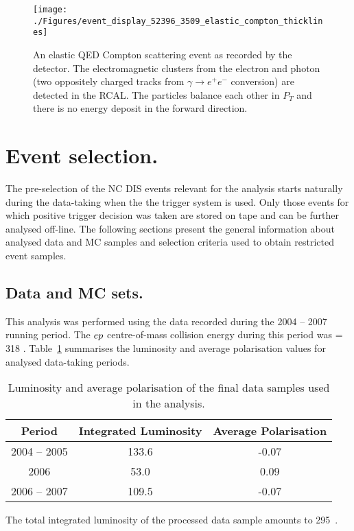 \begin{figure}[htbp]
	\centering
	\texttt{[image: ./Figures/event\_display\_52396\_3509\_elastic\_compton\_thicklines]} 
	\caption{An elastic QED Compton scattering event as recorded by the \zeus detector. The electromagnetic clusters from the electron and photon (two oppositely charged tracks from $\gamma \rightarrow e^+e^-$ conversion) are detected in the RCAL. The particles balance each other in $P_T$ and there is no energy deposit in the forward direction.}
	\label{fig:qedceventdisplay}
\end{figure}

\section{Event selection.}
The pre-selection of the NC DIS events relevant for the analysis starts naturally during the data-taking when the the \zeus trigger system is used. Only those events for which positive trigger decision was taken are stored on tape and can be further analysed off-line. The following sections present the general information about analysed data and MC samples and selection criteria used to obtain restricted event samples.

\subsection{Data and MC sets.}
This analysis was performed using the data recorded during the 2004 -- 2007 running period. The $\mbox{$e p$}$ centre-of-mass collision energy during this period was \sqs = 318 \GeV. Table~\ref{tab:selecteddatasample} summarises the luminosity and average polarisation values for analysed data-taking periods.
\begin{table}
	\centering
		\begin{tabular}[h]{|c|c|c|}
		  \hline
			Period & Integrated Luminosity & Average Polarisation \\
			\hline \hline
			2004 -- 2005  & 133.6 \invpb  & -0.07 \invpb \\
			2006             & 53.0 \invpb    &  0.09 \invpb \\
			2006 -- 2007  & 109.5 \invpb  & -0.07 \invpb \\
			\hline
		\end{tabular}
	\caption{Luminosity and average polarisation of the final data samples used in the analysis.}
	\label{tab:selecteddatasample}
\end{table}
The total integrated luminosity of the processed data sample amounts to 295~\invpb.

